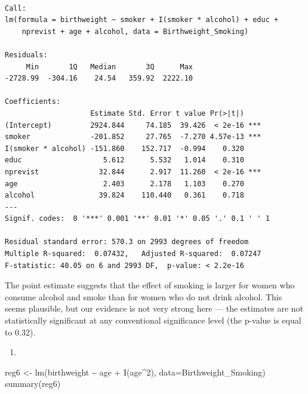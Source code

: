 \documentclass[
  letterpaper,
  DIV=11,
  numbers=noendperiod]{scrreprt}
\newenvironment{Shaded}{\begin{snugshade}}{\end{snugshade}}
\newcommand{\AttributeTok}[1]{\textcolor[rgb]{0.40,0.45,0.13}{#1}}
\newcommand{\DecValTok}[1]{\textcolor[rgb]{0.68,0.00,0.00}{#1}}
\newcommand{\FunctionTok}[1]{\textcolor[rgb]{0.28,0.35,0.67}{#1}}
\newcommand{\NormalTok}[1]{\textcolor[rgb]{0.00,0.23,0.31}{#1}}
\newcommand{\OtherTok}[1]{\textcolor[rgb]{0.00,0.23,0.31}{#1}}
\newcommand{\SpecialCharTok}[1]{\textcolor[rgb]{0.37,0.37,0.37}{#1}}
\providecommand{\tightlist}{%
  \setlength{\itemsep}{0pt}\setlength{\parskip}{0pt}}\usepackage{longtable,booktabs,array}
\begin{document}
\begin{verbatim}

Call:
lm(formula = birthweight ~ smoker + I(smoker * alcohol) + educ + 
    nprevist + age + alcohol, data = Birthweight_Smoking)

Residuals:
     Min       1Q   Median       3Q      Max 
-2728.99  -304.16    24.54   359.92  2222.10 

Coefficients:
                    Estimate Std. Error t value Pr(>|t|)    
(Intercept)         2924.844     74.185  39.426  < 2e-16 ***
smoker              -201.852     27.765  -7.270 4.57e-13 ***
I(smoker * alcohol) -151.860    152.717  -0.994    0.320    
educ                   5.612      5.532   1.014    0.310    
nprevist              32.844      2.917  11.260  < 2e-16 ***
age                    2.403      2.178   1.103    0.270    
alcohol               39.824    110.440   0.361    0.718    
---
Signif. codes:  0 '***' 0.001 '**' 0.01 '*' 0.05 '.' 0.1 ' ' 1

Residual standard error: 570.3 on 2993 degrees of freedom
Multiple R-squared:  0.07432,   Adjusted R-squared:  0.07247 
F-statistic: 40.05 on 6 and 2993 DF,  p-value: < 2.2e-16
\end{verbatim}

The point estimate suggests that the effect of smoking is larger for
women who consume alcohol and smoke than for women who do not drink
alcohol. This seems plausible, but our evidence is not very strong here
--- the estimates are not statistically significant at any conventional
significance level (the p-value is equal to 0.32).

\begin{enumerate}
\def\labelenumi{\arabic{enumi}.}
\setcounter{enumi}{5}
\tightlist
\item
\end{enumerate}

\begin{Shaded}
\begin{Highlighting}[]
\NormalTok{reg6 }\OtherTok{\textless{}{-}} \FunctionTok{lm}\NormalTok{(birthweight }\SpecialCharTok{\textasciitilde{}}\NormalTok{ age }\SpecialCharTok{+} \FunctionTok{I}\NormalTok{(age}\SpecialCharTok{\^{}}\DecValTok{2}\NormalTok{), }\AttributeTok{data=}\NormalTok{Birthweight\_Smoking)}
\FunctionTok{summary}\NormalTok{(reg6)}
\end{Highlighting}
\end{Shaded}
\end{document}
